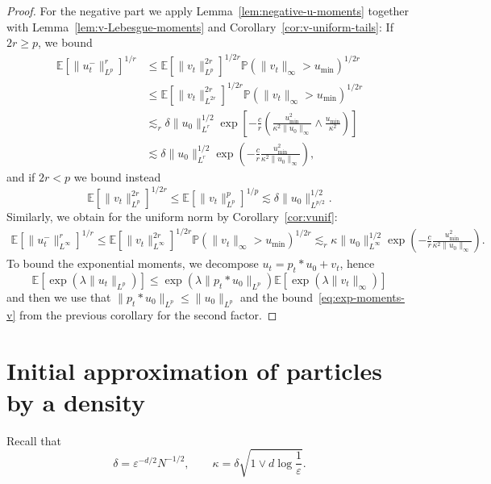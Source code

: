 \documentclass[a4paper,12pt]{article}
\newcommand{\E}{\mathbb{E}}
\begin{document}
\begin{proof}
For the negative part we apply Lemma~\ref{lem:negative-u-moments} together with Lemma~\ref{lem:v-Lebesgue-moments} and Corollary~\ref{cor:v-uniform-tails}: If $2r \geq p$, we bound
\begin{align*}
    \mathbb{E} [\| u^-_t \|_{L^p}^r]^{1/r} & \leq \mathbb{E} [\| v_t \|_{L^p}^{2 r}]^{1 / 2r} \mathbb{P} (\| v_t \|_{\infty} > u_{\min})^{1 / 2r} \\
    & \leq \E[\| v_t \|_{L^{2r}}^{2 r}]^{1 / 2r} \mathbb{P} \left(\| v_t \|_{\infty} > u_{\min}\right)^{1 / 2r} \\
    & \lesssim_r \delta \|u_0\|_{L^r}^{1/2}  \exp \left[ -\frac{c}{r}\left( \frac{u_{\min}^2}{\kappa^2 \|u_0\|_\infty} \wedge \frac{u_{\min}}{\kappa^2}\right)\right] \\
    & \lesssim \delta \|u_0\|_{L^r}^{1/2}  \exp \left( -\frac{c}{r} \frac{u_{\min}^2}{\kappa^2\|u_0\|_\infty}\right),
\end{align*}
and if $2r < p$ we bound instead
\[
    \mathbb{E} [\| v_t \|_{L^p}^{2 r}]^{1 / 2r} \leq \mathbb{E} [\| v_t \|_{L^p}^{p}]^{1 / p} \lesssim \delta \|u_0\|_{L^{p/2}}^{1/2}.
\]
Similarly, we obtain for the uniform norm by Corollary~\ref{cor:vunif}:
\begin{align*}
    \mathbb{E} [\| u^-_t \|_{L^\infty}^r]^{1/r} \leq \mathbb{E} [\| v_t \|_{L^\infty}^{2 r}]^{1 / 2r} \mathbb{P} (\| v_t \|_{\infty} > u_{\min})^{1 / 2r} \lesssim_r \kappa \|u_0\|_{L^\infty}^{1/2}  \exp \left( -\frac{c}{r} \frac{u_{\min}^2}{\kappa^2\|u_0\|_\infty}\right).
\end{align*}
To bound the exponential moments, we decompose $u_t = p_t \ast u_0 + v_t$, hence
\[
\mathbb{E}\left[\exp \left(\lambda \| u_t \|_{L^p} \right) \right] \leq \exp (\lambda\|p_t \ast u_0\|_{L^p}) \mathbb{E}\left[\exp\left(\lambda \| v_t \|_\infty \right)\right]
\]
and then we use that $\|p_t \ast u_0\|_{L^p} \leq \|u_0\|_{L^p}$ and the bound~\eqref{eq:exp-moments-v} from the previous corollary for the second factor. 
\end{proof}

\section{Initial approximation of particles by a density}\label{sec:initial_approx}

Recall that
\[
    \delta = \varepsilon^{-d/2}N^{-1/2},\qquad \kappa = \delta \sqrt{1\vee d\log \frac{1}{\varepsilon}} .
\]
\end{document}
